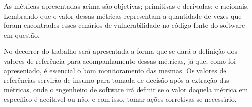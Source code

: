 As métricas apresentadas acima são objetivas; primitivas e derivadas; e racionais. Lembrando que o valor dessas métricas
representam a quantidade de vezes que foram encontrados esses cenários de vulnerabilidade no código fonte do software em 
questão.

No decorrer do trabalho será apresentada a forma que se dará a definição dos valores de referência para acompanhamento dessas
métricas, já que, como foi apresentado, é essencial o bom monitoramento das mesmas. Os valores de referências servirão
de insumo para tomada de decisão após a extração das métricas, onde o engenheiro de software irá definir se o valor daquela
métrica em específico é aceitável ou não, e com isso, tomar ações corretivas se necessário.

